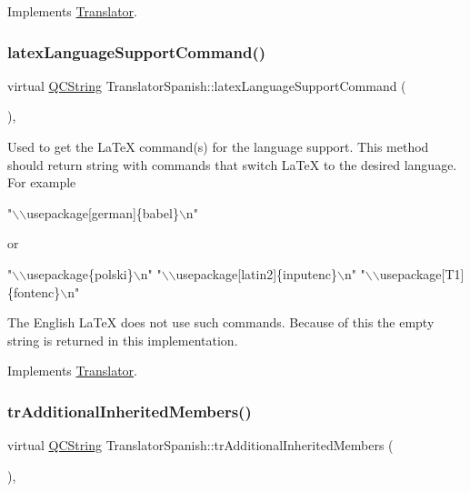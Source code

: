 Implements \mbox{\hyperlink{class_translator}{Translator}}.

\mbox{\label{class_translator_spanish_a93c5a964b33cbe12b80fa662db71f5a6}} 
\subsubsection{\texorpdfstring{latexLanguageSupportCommand()}{latexLanguageSupportCommand()}}
{\footnotesize\ttfamily virtual \mbox{\hyperlink{class_q_c_string}{Q\+C\+String}} Translator\+Spanish\+::latex\+Language\+Support\+Command (\begin{DoxyParamCaption}{ }\end{DoxyParamCaption})\hspace{0.3cm}{\ttfamily [inline]}, {\ttfamily [virtual]}}

Used to get the La\+TeX command(s) for the language support. This method should return string with commands that switch La\+TeX to the desired language. For example 
\begin{DoxyPre}"\(\backslash\)\(\backslash\)usepackage[german]\{babel\}\(\backslash\)n"
 \end{DoxyPre}
 or 
\begin{DoxyPre}"\(\backslash\)\(\backslash\)usepackage\{polski\}\(\backslash\)n"
 "\(\backslash\)\(\backslash\)usepackage[latin2]\{inputenc\}\(\backslash\)n"
 "\(\backslash\)\(\backslash\)usepackage[T1]\{fontenc\}\(\backslash\)n"
 \end{DoxyPre}


The English La\+TeX does not use such commands. Because of this the empty string is returned in this implementation. 

Implements \mbox{\hyperlink{class_translator}{Translator}}.

\mbox{\label{class_translator_spanish_a0973fb4487d4bbb0597cb37f64ffef24}} 
\subsubsection{\texorpdfstring{trAdditionalInheritedMembers()}{trAdditionalInheritedMembers()}}
{\footnotesize\ttfamily virtual \mbox{\hyperlink{class_q_c_string}{Q\+C\+String}} Translator\+Spanish\+::tr\+Additional\+Inherited\+Members (\begin{DoxyParamCaption}{ }\end{DoxyParamCaption})\hspace{0.3cm}{\ttfamily [inline]}, {\ttfamily [virtual]}}

